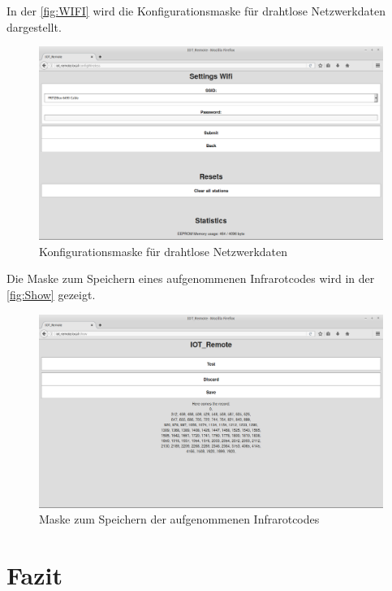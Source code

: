 In der \autoref{fig:WIFI} wird die Konfigurationsmaske für drahtlose Netzwerkdaten dargestellt.

\begin{figure}
	\centering
	\includegraphics[scale=0.3]{Abbildungen/WIFI}
	\caption{Konfigurationsmaske für drahtlose Netzwerkdaten}
	\label{fig:WIFI}
\end{figure}

Die Maske zum Speichern eines aufgenommenen Infrarotcodes wird in der \autoref{fig:Show} gezeigt.

\begin{figure}
	\centering
	\includegraphics[scale=0.3]{Abbildungen/Show}
	\caption{Maske zum Speichern der aufgenommenen Infrarotcodes}
	\label{fig:Show}
\end{figure}



\section{Fazit}

